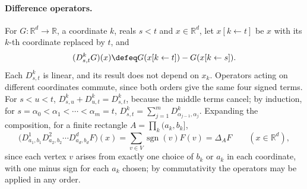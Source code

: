 \paragraph{Difference operators.} For \(G:\mathbb R^d\to\mathbb R\), a
coordinate \(k\), reals \(s<t\) and \(x\in\mathbb R^d\), let \(x[k\gets t]\)
be \(x\) with its \(k\)-th coordinate replaced by \(t\), and
\[
 (D^k_{s,t}G)(x)\defeq G(x[k\gets t])-G(x[k\gets s]).
\]
Each \(D^k_{s,t}\) is linear, and its result does not depend on \(x_k\).
Operators acting on different coordinates commute, since both orders give
the same four signed terms. For \(s<u<t\),
\(D^k_{s,u}+D^k_{u,t}=D^k_{s,t}\), because the middle terms cancel; by
induction, for \(s=\alpha_0<\alpha_1<\cdots<\alpha_m=t\),
\(D^k_{s,t}=\sum_{j=1}^mD^k_{\alpha_{j-1},\alpha_j}\). Expanding the
composition, for a finite rectangle \(A=\prod_k(a_k,b_k]\),
\[
 \bigl(D^1_{a_1,b_1}D^2_{a_2,b_2}\cdots D^d_{a_d,b_d}F\bigr)(x)
   =\sum_{v\in V}\operatorname{sgn}(v)F(v)=\Delta_AF
 \qquad(x\in\mathbb R^d),
\tag{\(\dagger\)}
\]
since each vertex \(v\) arises from exactly one choice of \(b_k\) or
\(a_k\) in each coordinate, with one minus sign for each \(a_k\) chosen;
by commutativity the operators may be applied in any order.

